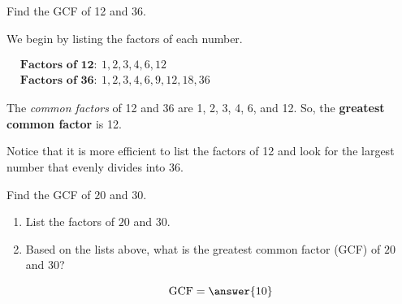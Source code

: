 \documentclass{ximera}[font=12pt]  %
\begin{document}
\begin{example}

Find the GCF of 12 and 36. 

\begin{explanation}

We begin by listing the factors of each number.

\begin{flushleft}
\hspace*{8em} %
$\begin{aligned}
& \textbf{Factors of 12}: \ 1, 2, 3, 4, 6, 12 \\[1.5ex]
& \textbf{Factors of 36}: \ 1, 2, 3, 4, 6, 9, 12, 18, 36
\end{aligned}$
\end{flushleft}

The \textit{common factors} of 12 and 36 are 1, 2, 3, 4, 6, and 12.  So, the \textbf{greatest common factor} is 12.  


\begin{remark}
Notice that it is more efficient to list the factors of 12 and look for the largest number that evenly divides into 36.  
\end{remark}

\end{explanation}

\end{example}


\begin{problem}
Find the GCF of $20$ and $30.$ 

\begin{enumerate}
\item List the factors of $20$ and $30.$

\begin{multipleChoice}
\end{multipleChoice}

\item Based on the lists above, what is the greatest common factor (GCF) of $20$ and $30$?

\[ \text{GCF} = \answer{10} \]

\end{enumerate}

\end{problem}
\end{document}
